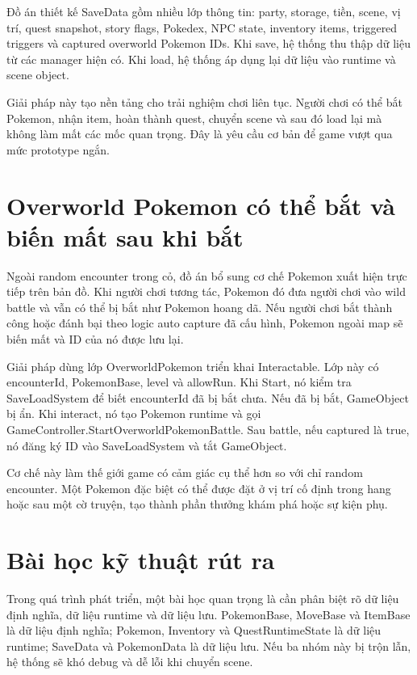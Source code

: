 Đồ án thiết kế SaveData gồm nhiều lớp thông tin: party, storage, tiền, scene, vị trí, quest snapshot, story flags, Pokedex, NPC state, inventory items, triggered triggers và captured overworld Pokemon IDs. Khi save, hệ thống thu thập dữ liệu từ các manager hiện có. Khi load, hệ thống áp dụng lại dữ liệu vào runtime và scene object.

Giải pháp này tạo nền tảng cho trải nghiệm chơi liên tục. Người chơi có thể bắt Pokemon, nhận item, hoàn thành quest, chuyển scene và sau đó load lại mà không làm mất các mốc quan trọng. Đây là yêu cầu cơ bản để game vượt qua mức prototype ngắn.

\section{Overworld Pokemon có thể bắt và biến mất sau khi bắt}

Ngoài random encounter trong cỏ, đồ án bổ sung cơ chế Pokemon xuất hiện trực tiếp trên bản đồ. Khi người chơi tương tác, Pokemon đó đưa người chơi vào wild battle và vẫn có thể bị bắt như Pokemon hoang dã. Nếu người chơi bắt thành công hoặc đánh bại theo logic auto capture đã cấu hình, Pokemon ngoài map sẽ biến mất và ID của nó được lưu lại.

Giải pháp dùng lớp OverworldPokemon triển khai Interactable. Lớp này có encounterId, PokemonBase, level và allowRun. Khi Start, nó kiểm tra SaveLoadSystem để biết encounterId đã bị bắt chưa. Nếu đã bị bắt, GameObject bị ẩn. Khi interact, nó tạo Pokemon runtime và gọi GameController.StartOverworldPokemonBattle. Sau battle, nếu captured là true, nó đăng ký ID vào SaveLoadSystem và tắt GameObject.

Cơ chế này làm thế giới game có cảm giác cụ thể hơn so với chỉ random encounter. Một Pokemon đặc biệt có thể được đặt ở vị trí cố định trong hang hoặc sau một cờ truyện, tạo thành phần thưởng khám phá hoặc sự kiện phụ.

\section{Bài học kỹ thuật rút ra}

Trong quá trình phát triển, một bài học quan trọng là cần phân biệt rõ dữ liệu định nghĩa, dữ liệu runtime và dữ liệu lưu. PokemonBase, MoveBase và ItemBase là dữ liệu định nghĩa; Pokemon, Inventory và QuestRuntimeState là dữ liệu runtime; SaveData và PokemonData là dữ liệu lưu. Nếu ba nhóm này bị trộn lẫn, hệ thống sẽ khó debug và dễ lỗi khi chuyển scene.

